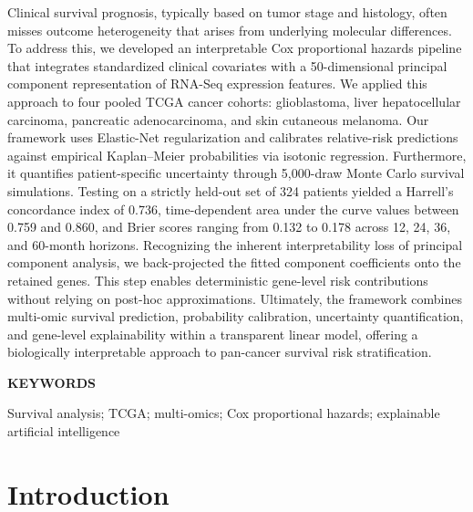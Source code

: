 \documentclass[10pt,a4paper]{article}
\begin{document}
Clinical survival prognosis, typically based on tumor stage and histology, often misses outcome heterogeneity that arises from underlying molecular differences. To address this, we developed an interpretable Cox proportional hazards pipeline that integrates standardized clinical covariates with a 50-dimensional principal component representation of RNA-Seq expression features. We applied this approach to four pooled TCGA cancer cohorts: glioblastoma, liver hepatocellular carcinoma, pancreatic adenocarcinoma, and skin cutaneous melanoma. Our framework uses Elastic-Net regularization and calibrates relative-risk predictions against empirical Kaplan--Meier probabilities via isotonic regression. Furthermore, it quantifies patient-specific uncertainty through 5,000-draw Monte Carlo survival simulations. Testing on a strictly held-out set of 324 patients yielded a Harrell's concordance index of 0.736, time-dependent area under the curve values between 0.759 and 0.860, and Brier scores ranging from 0.132 to 0.178 across 12, 24, 36, and 60-month horizons. Recognizing the inherent interpretability loss of principal component analysis, we back-projected the fitted component coefficients onto the retained genes. This step enables deterministic gene-level risk contributions without relying on post-hoc approximations. Ultimately, the framework combines multi-omic survival prediction, probability calibration, uncertainty quantification, and gene-level explainability within a transparent linear model, offering a biologically interpretable approach to pan-cancer survival risk stratification.



\vspace{1em}
{\bfseries KEYWORDS\par}

Survival analysis; TCGA; multi-omics; Cox proportional hazards;
explainable artificial intelligence 
\vspace{3pt}

\section{Introduction}
\end{document}

